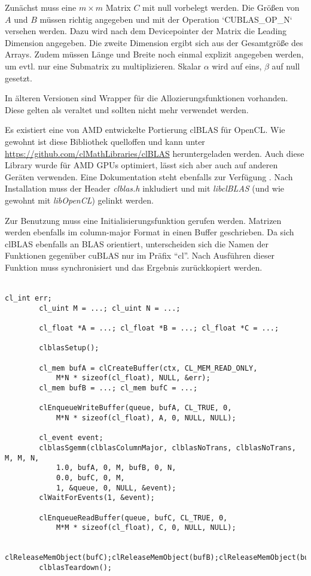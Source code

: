 		Zunächst muss eine $m\times m$ Matrix $C$ mit null vorbelegt werden. Die Größen von $A$ und $B$ müssen richtig angegeben und mit der Operation \li`CUBLAS_OP_N` versehen werden. Dazu wird nach dem Devicepointer der Matrix die Leading Dimension angegeben. Die zweite Dimension ergibt sich aus der Gesamtgröße des Arrays. Zudem müssen Länge und Breite noch einmal explizit angegeben werden, um evtl. nur eine Submatrix zu multiplizieren. Skalar $\alpha$ wird auf eins, $\beta$ auf null gesetzt. 
		
		In älteren Versionen sind Wrapper für die Allozierungsfunktionen vorhanden. Diese gelten als veraltet und sollten nicht mehr verwendet werden.
		
		Es existiert eine von AMD entwickelte Portierung clBLAS für OpenCL. Wie gewohnt ist diese Bibliothek quelloffen und kann unter \url{https://github.com/clMathLibraries/clBLAS} heruntergeladen werden. Auch diese Library wurde für AMD GPUs optimiert, lässt sich aber auch auf anderen Geräten verwenden. Eine Dokumentation steht ebenfalls zur Verfügung \autocite{clblasDoc}. Nach Installation muss der Header \textit{clblas.h} inkludiert und mit \textit{libclBLAS} (und wie gewohnt mit \textit{libOpenCL}) gelinkt werden.

		Zur Benutzung muss eine Initialisierungsfunktion gerufen werden. Matrizen werden ebenfalls im column-major Format in einen Buffer geschrieben. Da sich clBLAS ebenfalls an BLAS orientiert, unterscheiden sich die Namen der Funktionen gegenüber cuBLAS nur im Präfix \enquote{cl}. Nach Ausführen dieser Funktion muss synchronisiert und das Ergebnis zurückkopiert werden.\\ \\
		\begin{lstlisting}[caption=clBLAS Beispiel]
		cl_int err;
		cl_uint M = ...; cl_uint N = ...;
		
		cl_float *A = ...; cl_float *B = ...; cl_float *C = ...;
		
		clblasSetup();
		
		cl_mem bufA = clCreateBuffer(ctx, CL_MEM_READ_ONLY,  
			M*N * sizeof(cl_float), NULL, &err); 
		cl_mem bufB = ...; cl_mem bufC = ...;

		clEnqueueWriteBuffer(queue, bufA, CL_TRUE, 0, 
			M*N * sizeof(cl_float), A, 0, NULL, NULL);       
		 
		cl_event event;
		clblasSgemm(clblasColumnMajor, clblasNoTrans, clblasNoTrans, M, M, N,
			1.0, bufA, 0, M, bufB, 0, N, 
			0.0, bufC, 0, M,
			1, &queue, 0, NULL, &event);
		clWaitForEvents(1, &event);

		clEnqueueReadBuffer(queue, bufC, CL_TRUE, 0, 
			M*M * sizeof(cl_float), C, 0, NULL, NULL);

		clReleaseMemObject(bufC);clReleaseMemObject(bufB);clReleaseMemObject(bufA);
		clblasTeardown();
		\end{lstlisting}
		
